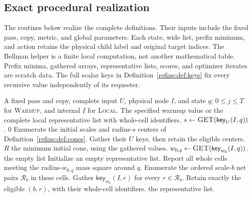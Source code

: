 \documentclass[11pt]{article}
\newcommand{\wedkey}[2]{\mathsf{key}_{#1}(#2)}
\newenvironment{wedalgorithm}[2]{%
  \begin{algorithm}[!htbp]%
  \caption{#1}\label{#2}%
  \small\begin{algorithmic}[1]%
}{%
  \end{algorithmic}\end{algorithm}%
}
\theoremstyle{definition}
\newcommand{\1}{\mathbf 1}
\begin{document}
\subsection{Exact procedural realization}

The routines below realize the complete definitions. Their inputs
include the fixed pass, copy, metric, and global parameters. Each state,
wide list, prefix minimum, and action retains the physical child label
and original target indices. The Bellman helper is a finite local
computation, not another mathematical table. Prefix minima, gathered
arrays, representative lists, scores, and optimizer iterates are scratch
data. The full scalar keys in Definition~\ref{refine:def:keys} fix every
recursive value independently of its requester.

\begin{wedalgorithm}{Warmup entries and local representatives}{alg:warmup-local}
\Require A fixed pass and copy, complete input $U$, physical node $I$, and state $q$; $0\le j\le T$ for \textsc{Warmup}, and internal $I$ for \textsc{Local}.
\Ensure The specified warmup value or the complete local representative list with whole-cell identifiers.
   \State \Return {} \EndIf
   \State \Return {} \EndIf
  \State $s\gets\Call{GET}{\wedkey{U}{I,q}}$.
   \State \Return $0$ \EndIf
  \State Enumerate the initial scales and radius-$s$ centers of Definition~\ref{refine:def:cones}.
  \State Gather their $U$ keys, then retain the eligible centers.
   \State \Return $R$ \EndIf
  \State \Return the minimum initial cone, using the gathered values.
\EndProcedure
\Statex
{}
  \State $w_{0,q}\gets\Call{GET}{\wedkey{w_0}{I,q}}$.
   \State \Return the empty list \EndIf
  \State Initialize an empty representative list.
    \State Report all whole cells meeting the radius-$w_{0,q}$ mass square around $q$.
    \State Enumerate the ordered scale-$b$ net pairs $\mathcal R_b$ in these cells.
    \State Gather $\wedkey{w_0}{I,r}$ for every $r\in\mathcal R_b$.
    \State Retain exactly the eligible $(b,r)$, with their whole-cell identifiers.
  \EndFor
  \State \Return the representative list.
\EndProcedure
\end{wedalgorithm}
\end{document}
